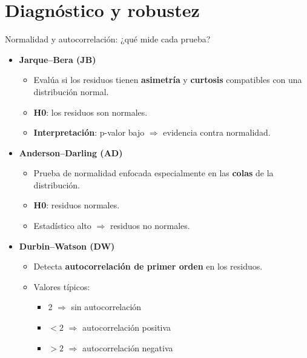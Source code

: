 \documentclass[aspectratio=169,10pt]{beamer}
\begin{document}

\section{Diagnóstico y robustez}

\begin{frame}[fragile]{Normalidad y autocorrelación: ¿qué mide cada prueba?}

\begin{itemize}
  \item \textbf{Jarque–Bera (JB)}
    \begin{itemize}
      \item Evalúa si los residuos tienen \textbf{asimetría} y \textbf{curtosis} compatibles con una distribución normal.
      \item \textbf{H0}: los residuos son normales.
      \item \textbf{Interpretación}: p-valor bajo $\Rightarrow$ evidencia contra normalidad.
    \end{itemize}

  \item \textbf{Anderson–Darling (AD)}
    \begin{itemize}
      \item Prueba de normalidad enfocada especialmente en las \textbf{colas} de la distribución.
      \item \textbf{H0}: residuos normales.
      \item Estadístico alto $\Rightarrow$ residuos no normales.
    \end{itemize}

  \item \textbf{Durbin–Watson (DW)}
    \begin{itemize}
      \item Detecta \textbf{autocorrelación de primer orden} en los residuos.
      \item Valores típicos:
        \begin{itemize}
          \item 2 $\Rightarrow$ sin autocorrelación
          \item $< 2$ $\Rightarrow$ autocorrelación positiva
          \item $> 2$ $\Rightarrow$ autocorrelación negativa
        \end{itemize}
    \end{itemize}
\end{itemize}

\end{frame}
\end{document}
